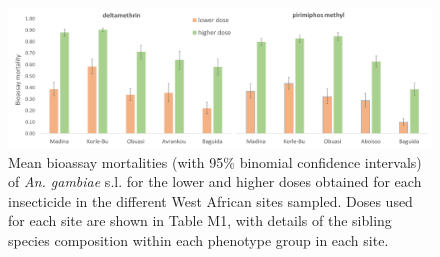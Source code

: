 \documentclass[a4paper,12pt]{article}
\begin{document}
\begin{figure}[h]
	\begin{center}
		\includegraphics*[width = 6in]{figures/bioassay_results.png}
	\end{center}
	\caption{\footnotesize Mean bioassay mortalities (with 95\% binomial confidence intervals) of \textit{An. gambiae} s.l. for the lower and higher doses obtained for each insecticide in the different West African sites sampled. Doses used for each site are shown in Table M1, with details of the sibling species composition within each phenotype group in each site.}
	\label{FigM2}
\end{figure}

\vskip 1cm
\end{document}
